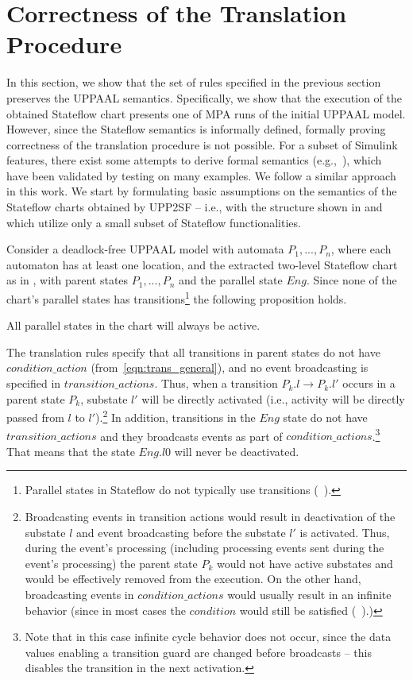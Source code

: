 \section{Correctness of the Translation Procedure}
\label{sec:correc}

In this section, we show that the set of rules specified in the previous section preserves the UPPAAL semantics. Specifically, we show that the execution of the obtained Stateflow chart presents one of MPA runs of the initial UPPAAL model. 
However, since the Stateflow semantics is informally defined, formally proving correctness of the translation procedure is not possible. For a subset of Simulink features, there exist some attempts to derive formal semantics (e.g.,~\cite{SFsem1,SFsem2}), which have been validated by testing on many examples. We follow a similar approach in this work. We start by formulating basic assumptions on the semantics of the Stateflow charts obtained by UPP2SF -- i.e., with the structure shown in  and which utilize only a small subset of Stateflow functionalities. 


Consider a deadlock-free UPPAAL model with automata $P_1,...,P_n$, where each automaton has at least one location, and the extracted two-level Stateflow chart as in , with parent states $P_1,...,P_n$ and the parallel state $Eng$. Since none of the chart's parallel states has transitions\footnote{Parallel states in Stateflow do not typically use transitions (~\cite{stateflow,SFsem1}).} the following proposition holds.

\begin{proposition}
\label{p1_allactive}
All parallel states in the chart will always be active.
\end{proposition}

The translation rules specify that all transitions in parent states do not have $condition\_action$  (from~\eqref{eqn:trans_general}), and no event broadcasting is specified in $transition\_actions$. Thus, when a transition $P_k.l\rightarrow P_k.l'$ occurs in a parent state $P_k$, substate $l'$ will be directly activated (i.e., activity will be directly passed from $l$ to $l'$).\footnote{Broadcasting events in transition actions would result in deactivation of the substate $l$ and event broadcasting before the substate $l'$ is activated. Thus, during the event's processing (including processing events sent during the event's processing) the parent state $P_k$ would not have active substates and would be effectively removed from the execution. On the other hand, broadcasting events in $condition\_actions$ would usually result in an infinite behavior (since in most cases the $condition$ would still be satisfied (~\cite{stateflow}).)} 
In addition, transitions in the $Eng$ state do not have $transition\_actions$ and they broadcasts events as part of $condition\_actions$.\footnote{Note that in this case infinite cycle behavior does not occur, since the data values enabling a transition guard are changed before broadcasts -- this disables the transition in the next activation.} That means that the state $Eng.l0$ will never be deactivated.

